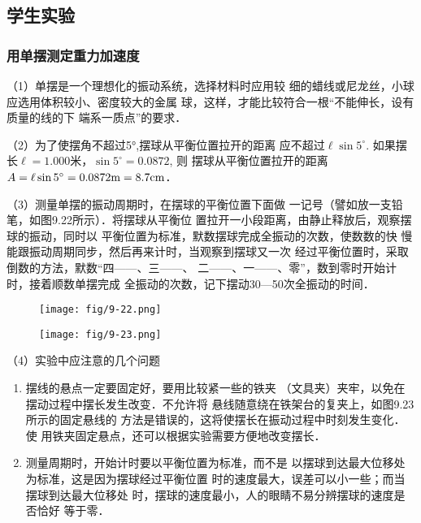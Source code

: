 \subsection{学生实验}
\subsubsection{用单摆测定重力加速度}
（1）单摆是一个理想化的振动系统，选择材料时应用较
细的蜡线或尼龙丝，小球应选用体积较小、密度较大的金属
球，这样，才能比较符合一根“不能伸长，设有质量的线的下
端系一质点”的要求．

（2）为了使摆角不超过5°,摆球从平衡位置拉开的距离
应不超过$\ell\sin5^{\circ}$. 如果摆长$\ell=1.000$米，$\sin5^{\circ}=0.0872$, 则
摆球从平衡位置拉开的距离$A=\ell\sin5^{\circ}=0.0872{\rm m}=8.7{\rm cm}$．

（3）测量单摆的振动周期时，在摆球的平衡位置下面做
一记号（譬如放一支铅笔，如图9.22所示）．将摆球从平衡位
置拉开一小段距离，由静止释放后，观察摆球的振动，同时以
平衡位置为标准，默数摆球完成全振动的次数，使数数的快
慢能跟振动周期同步，然后再来计时，当观察到摆球又一次
经过平衡位置时，采取倒数的方法，默数“四——、三——、
二——、一——、零”，数到零时开始计时，接着顺数单摆完成
全振动的次数，记下摆动30—50次全振动的时间．

\begin{figure}[htp]\centering
    \begin{minipage}[t]{0.48\textwidth}
    \centering
\texttt{[image: fig/9-22.png]}
    \caption{}
    \end{minipage}
    \begin{minipage}[t]{0.48\textwidth}
    \centering
\texttt{[image: fig/9-23.png]}
    \caption{}
    \end{minipage}
    \end{figure}

（4）实验中应注意的几个问题
\begin{enumerate}
\item 摆线的悬点一定要固定好，要用比较紧一些的铁夹
（文具夹）夹牢，以免在摆动过程中摆长发生改变．不允许将
悬线随意绕在铁架台的复夹上，如图9.23所示的固定悬线的
方法是错误的，这将使摆长在振动过程中时刻发生变化．使
用铁夹固定悬点，还可以根据实验需要方便地改变摆长．

\item 测量周期时，开始计时要以平衡位置为标准，而不是
以摆球到达最大位移处为标准，这是因为摆球经过平衡位置
时的速度最大，误差可以小一些；而当摆球到达最大位移处
时，摆球的速度最小，人的眼睛不易分辨摆球的速度是否恰好
等于零．
\end{enumerate}


